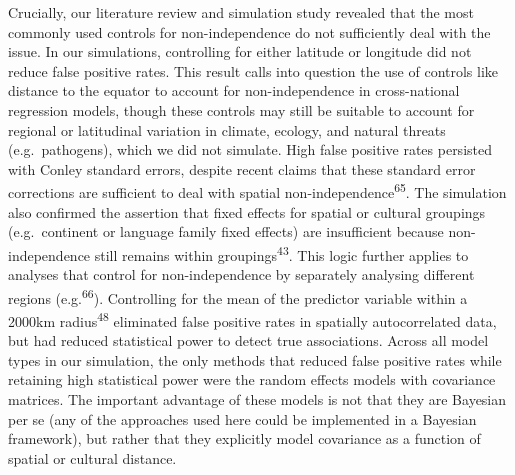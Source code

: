 \documentclass[
  man,floatsintext]{apa6}
\begin{document}
Crucially, our literature review and simulation study revealed that the most commonly used controls for non-independence do not sufficiently deal with the issue. In our simulations, controlling for either latitude or longitude did not reduce false positive rates. This result calls into question the use of controls like distance to the equator to account for non-independence in cross-national regression models, though these controls may still be suitable to account for regional or latitudinal variation in climate, ecology, and natural threats (e.g.~pathogens), which we did not simulate. High false positive rates persisted with Conley standard errors, despite recent claims that these standard error corrections are sufficient to deal with spatial non-independence\textsuperscript{65}. The simulation also confirmed the assertion that fixed effects for spatial or cultural groupings (e.g.~continent or language family fixed effects) are insufficient because non-independence still remains within groupings\textsuperscript{43}. This logic further applies to analyses that control for non-independence by separately analysing different regions (e.g.\textsuperscript{66}). Controlling for the mean of the predictor variable within a 2000km radius\textsuperscript{48} eliminated false positive rates in spatially autocorrelated data, but had reduced statistical power to detect true associations. Across all model types in our simulation, the only methods that reduced false positive rates while retaining high statistical power were the random effects models with covariance matrices. The important advantage of these models is not that they are Bayesian per se (any of the approaches used here could be implemented in a Bayesian framework), but rather that they explicitly model covariance as a function of spatial or cultural distance.
\end{document}
